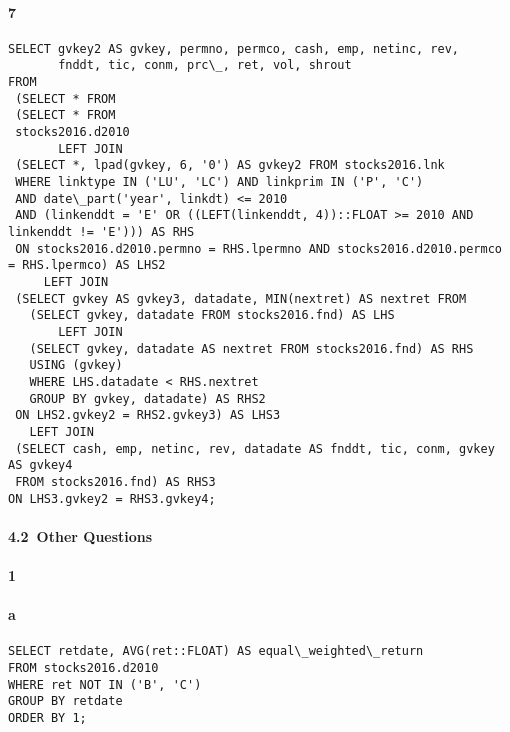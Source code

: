 \documentclass[]{article}
\let\oldparagraph\paragraph
\renewcommand{\paragraph}[1]{\oldparagraph{#1}\mbox{}}
\begin{document}
\paragraph{7}

\color{blue}
\begin{verbatim}
SELECT gvkey2 AS gvkey, permno, permco, cash, emp, netinc, rev,
       fnddt, tic, conm, prc\_, ret, vol, shrout
FROM
 (SELECT * FROM
 (SELECT * FROM
 stocks2016.d2010
       LEFT JOIN
 (SELECT *, lpad(gvkey, 6, '0') AS gvkey2 FROM stocks2016.lnk
 WHERE linktype IN ('LU', 'LC') AND linkprim IN ('P', 'C')
 AND date\_part('year', linkdt) <= 2010
 AND (linkenddt = 'E' OR ((LEFT(linkenddt, 4))::FLOAT >= 2010 AND linkenddt != 'E'))) AS RHS
 ON stocks2016.d2010.permno = RHS.lpermno AND stocks2016.d2010.permco = RHS.lpermco) AS LHS2
     LEFT JOIN
 (SELECT gvkey AS gvkey3, datadate, MIN(nextret) AS nextret FROM
   (SELECT gvkey, datadate FROM stocks2016.fnd) AS LHS
       LEFT JOIN
   (SELECT gvkey, datadate AS nextret FROM stocks2016.fnd) AS RHS
   USING (gvkey)
   WHERE LHS.datadate < RHS.nextret
   GROUP BY gvkey, datadate) AS RHS2
 ON LHS2.gvkey2 = RHS2.gvkey3) AS LHS3
   LEFT JOIN
 (SELECT cash, emp, netinc, rev, datadate AS fnddt, tic, conm, gvkey AS gvkey4
 FROM stocks2016.fnd) AS RHS3
ON LHS3.gvkey2 = RHS3.gvkey4;
\end{verbatim}
\color{black}





\paragraph{4.2\ Other Questions}

\paragraph{1}

\paragraph{a}

\color{blue}
\begin{verbatim}
SELECT retdate, AVG(ret::FLOAT) AS equal\_weighted\_return
FROM stocks2016.d2010
WHERE ret NOT IN ('B', 'C')
GROUP BY retdate
ORDER BY 1;
\end{verbatim}
\color{black}
\end{document}
